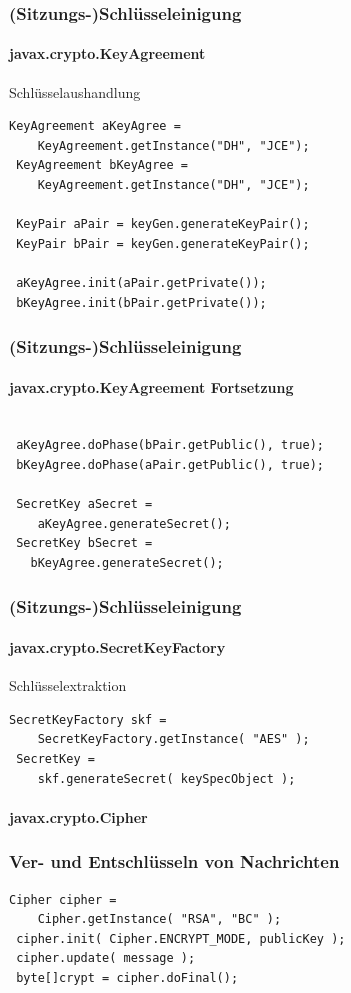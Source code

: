 \documentclass{beamer}
\begin{document}
\begin{frame}[fragile]
\frametitle{(Sitzungs-)Schlüsseleinigung}
\framesubtitle{javax.crypto.KeyAgreement}
Schlüsselaushandlung
\begin{lstlisting}[frame=trl]
 KeyAgreement aKeyAgree =
  	KeyAgreement.getInstance("DH", "JCE");
 KeyAgreement bKeyAgree = 
  	KeyAgreement.getInstance("DH", "JCE");
   
 KeyPair aPair = keyGen.generateKeyPair();
 KeyPair bPair = keyGen.generateKeyPair();
 
 aKeyAgree.init(aPair.getPrivate());
 bKeyAgree.init(bPair.getPrivate());
\end{lstlisting}
\end{frame}

\begin{frame}[fragile]
\frametitle{(Sitzungs-)Schlüsseleinigung}
\framesubtitle{javax.crypto.KeyAgreement Fortsetzung}
\begin{lstlisting}[frame=rlb]

 aKeyAgree.doPhase(bPair.getPublic(), true);
 bKeyAgree.doPhase(aPair.getPublic(), true);

 SecretKey aSecret =
   	aKeyAgree.generateSecret();
 SecretKey bSecret =
   bKeyAgree.generateSecret();
\end{lstlisting}
\end{frame}

\begin{frame}[fragile]
\frametitle{(Sitzungs-)Schlüsseleinigung}
\framesubtitle{javax.crypto.SecretKeyFactory}
Schlüsselextraktion
\begin{lstlisting}[frame=shadowbox]
 SecretKeyFactory skf =
 	SecretKeyFactory.getInstance( "AES" );
 SecretKey = 
 	skf.generateSecret( keySpecObject );
\end{lstlisting}
\end{frame}

\begin{frame}[fragile]
\framesubtitle{javax.crypto.Cipher}
\frametitle{Ver- und Entschlüsseln von Nachrichten}
\begin{lstlisting}[frame=shadowbox]
 Cipher cipher = 
 	Cipher.getInstance( "RSA", "BC" );
 cipher.init( Cipher.ENCRYPT_MODE, publicKey );
 cipher.update( message );
 byte[]crypt = cipher.doFinal();
\end{lstlisting}
\end{frame}
\end{document}
